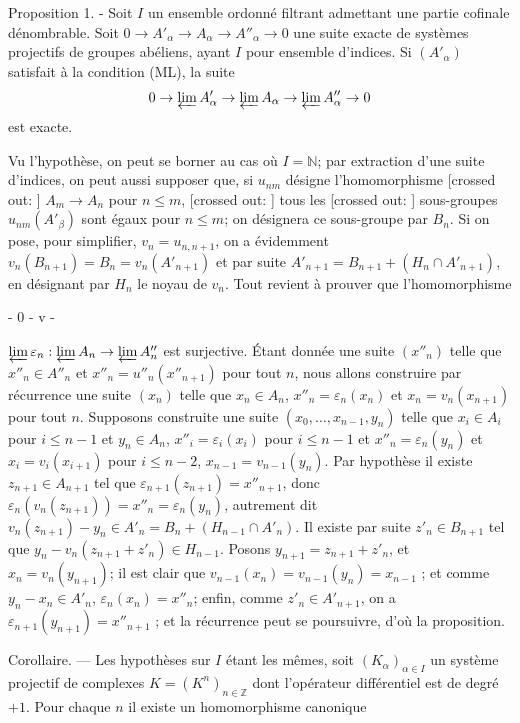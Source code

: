 Proposition 1. - Soit $I$ un ensemble ordonné filtrant admettant une partie cofinale dénombrable. Soit $0 \to A'_{\alpha} \to A_{\alpha} \to A''_{\alpha} \to 0$ une suite exacte de systèmes projectifs de groupes abéliens, ayant $I$ pour ensemble d'indices. Si $(A'_{\alpha})$ satisfait à la condition (ML), la suite
$$0 \to \varprojlim A'_{\alpha} \to \varprojlim A_{\alpha} \to \varprojlim A''_{\alpha} \to 0$$
est exacte.

Vu l'hypothèse, on peut se borner au cas où $I=\mathbb{N}$; par extraction d'une suite d'indices, on peut aussi supposer que, si $u_{nm}$ désigne l'homomorphisme [crossed out: ] $A_m \to A_n$ pour $n \leq m$, [crossed out: ] tous les [crossed out: ] sous-groupes $u_{nm}(A'_{\beta})$ sont égaux pour $n \leq m$; on désignera ce sous-groupe par $B_n$. Si on pose, pour simplifier, $v_n=u_{n,n+1}$, on a évidemment $v_n(B_{n+1})=B_n=v_n(A'_{n+1})$ et par suite $A'_{n+1}=B_{n+1}+(H_n \cap A'_{n+1})$, en désignant par $H_n$ le noyau de $v_n$. Tout revient à prouver que l'homomorphisme

\newpage


- 0 - v -

$\varprojlim \varepsilon_n : \varprojlim A_n \to \varprojlim A''_n$ est surjective. Étant donnée une suite $(x''_n)$ telle que $x''_n \in A''_n$ et $x''_n = u''_n(x''_{n+1})$ pour tout $n$, nous allons construire par récurrence une suite $(x_n)$ telle que $x_n \in A_n$, $x''_n = \varepsilon_n(x_n)$ et $x_n = v_n(x_{n+1})$ pour tout $n$. Supposons construite une suite $(x_0, \dots, x_{n-1}, y_n)$ telle que $x_i \in A_i$ pour $i \leq n-1$ et $y_n \in A_n$, $x''_i = \varepsilon_i(x_i)$ pour $i \leq n-1$ et $x''_n = \varepsilon_n(y_n)$ et $x_i = v_i(x_{i+1})$ pour $i \leq n-2$, $x_{n-1} = v_{n-1}(y_n)$. Par hypothèse il existe $z_{n+1} \in A_{n+1}$ tel que $\varepsilon_{n+1}(z_{n+1}) = x''_{n+1}$, donc $\varepsilon_n(v_n(z_{n+1})) = x''_n = \varepsilon_n(y_n)$, autrement dit $v_n(z_{n+1}) - y_n \in A'_n = B_n + (H_{n-1} \cap A'_n)$. Il existe par suite $z'_n \in B_{n+1}$ tel que $y_n - v_n(z_{n+1} + z'_n) \in H_{n-1}$. Posons $y_{n+1} = z_{n+1} + z'_n$, et $x_n = v_n(y_{n+1})$; il est clair que $v_{n-1}(x_n) = v_{n-1}(y_n) = x_{n-1}$ ; et comme $y_n - x_n \in A'_n$, $\varepsilon_n(x_n) = x''_n$; enfin, comme $z'_n \in A'_{n+1}$, on a $\varepsilon_{n+1}(y_{n+1}) = x''_{n+1}$ ; et la récurrence peut se poursuivre, d'où la proposition.

Corollaire. — Les hypothèses sur $I$ étant les mêmes, soit $(K_\alpha)_{\alpha \in I}$ un système projectif de complexes $K = (K^n)_{n \in \mathbb{Z}}$ dont l'opérateur différentiel est de degré $+1$. Pour chaque $n$ il existe un homomorphisme canonique

